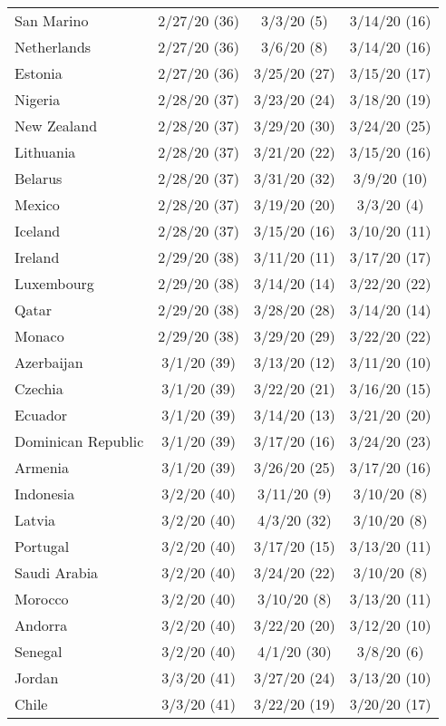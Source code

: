 \begin{table}[h]
\begin{longtable}{p{} c c c}
San Marino & 2/27/20 (36)  & 3/3/20 (5)  & 3/14/20 (16) \\
Netherlands & 2/27/20 (36)  & 3/6/20 (8)  & 3/14/20 (16) \\
Estonia & 2/27/20 (36)  & 3/25/20 (27)  & 3/15/20 (17) \\
\hline 
Nigeria & 2/28/20 (37)  & 3/23/20 (24)  & 3/18/20 (19) \\
New Zealand & 2/28/20 (37)  & 3/29/20 (30)  & 3/24/20 (25) \\
Lithuania & 2/28/20 (37)  & 3/21/20 (22)  & 3/15/20 (16) \\
Belarus & 2/28/20 (37)  & 3/31/20 (32)  & 3/9/20 (10) \\
Mexico & 2/28/20 (37)  & 3/19/20 (20)  & 3/3/20 (4) \\
Iceland & 2/28/20 (37)  & 3/15/20 (16)  & 3/10/20 (11) \\
\hline 
Ireland & 2/29/20 (38)  & 3/11/20 (11)  & 3/17/20 (17) \\
Luxembourg & 2/29/20 (38)  & 3/14/20 (14)  & 3/22/20 (22) \\
Qatar & 2/29/20 (38)  & 3/28/20 (28)  & 3/14/20 (14) \\
Monaco & 2/29/20 (38)  & 3/29/20 (29)  & 3/22/20 (22) \\
\hline 
Azerbaijan & 3/1/20 (39)  & 3/13/20 (12)  & 3/11/20 (10) \\
Czechia & 3/1/20 (39)  & 3/22/20 (21)  & 3/16/20 (15) \\
Ecuador & 3/1/20 (39)  & 3/14/20 (13)  & 3/21/20 (20) \\
Dominican Republic & 3/1/20 (39)  & 3/17/20 (16)  & 3/24/20 (23) \\
Armenia & 3/1/20 (39)  & 3/26/20 (25)  & 3/17/20 (16) \\
\hline 
Indonesia & 3/2/20 (40)  & 3/11/20 (9)  & 3/10/20 (8) \\
Latvia & 3/2/20 (40)  & 4/3/20 (32)  & 3/10/20 (8) \\
Portugal & 3/2/20 (40)  & 3/17/20 (15)  & 3/13/20 (11) \\
Saudi Arabia & 3/2/20 (40)  & 3/24/20 (22)  & 3/10/20 (8) \\
Morocco & 3/2/20 (40)  & 3/10/20 (8)  & 3/13/20 (11) \\
Andorra & 3/2/20 (40)  & 3/22/20 (20)  & 3/12/20 (10) \\
Senegal & 3/2/20 (40)  & 4/1/20 (30)  & 3/8/20 (6) \\
\hline 
Jordan & 3/3/20 (41)  & 3/27/20 (24)  & 3/13/20 (10) \\
Chile & 3/3/20 (41)  & 3/22/20 (19)  & 3/20/20 (17) \\

\end{longtable}
\end{table}
